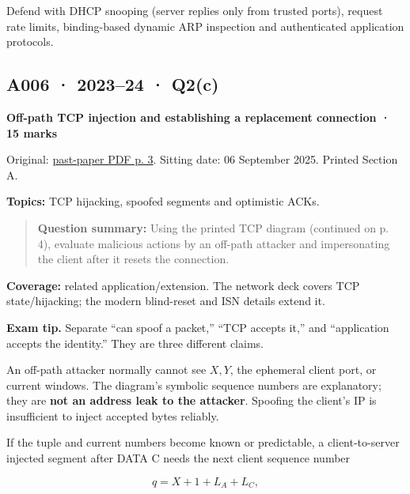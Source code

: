 \documentclass[11pt,a4paper]{article}
\begin{document}
Defend with DHCP snooping (server replies only from trusted ports),\allowbreak{} request rate limits,\allowbreak{} binding-based dynamic ARP inspection and authenticated application protocols.




\clearpage
\subsection{A006 · 2023–24 · Q2(c)}\label{a006}

\textbf{Off-path TCP injection and establishing a replacement connection · 15 marks}


Original: \href{../../CSE405-Security_Merged.pdf\#page=3}{past-paper PDF p. 3}. Sitting date: 06 September 2025. Printed Section A.


\textbf{Topics:} TCP hijacking,\allowbreak{} spoofed segments and optimistic ACKs.



\begin{quote}\small

\textbf{Question summary:} Using the printed TCP diagram (continued on p. 4),\allowbreak{} evaluate malicious actions by an off-path attacker and impersonating the client after it resets the connection.



\end{quote}

\textbf{Coverage:} related application/\allowbreak{}extension. The network deck covers TCP state/\allowbreak{}hijacking; the modern blind-reset and ISN details extend it.



{\color{ForestGreen}\textbf{Exam tip.} Separate “can spoof a packet,\allowbreak{}” “TCP accepts it,\allowbreak{}” and “application accepts the identity.” They are three different claims.}


An off-path attacker normally cannot see \(X,Y\),\allowbreak{} the ephemeral client port,\allowbreak{} or current windows. The diagram's symbolic sequence numbers are explanatory; they are \textbf{not an address leak to the attacker}. Spoofing the client's IP is insufficient to inject accepted bytes reliably.


If the tuple and current numbers become known or predictable,\allowbreak{} a client-to-server injected segment after DATA C needs the next client sequence number



\[
q=X+1+L_A+L_C,
\]
\end{document}

